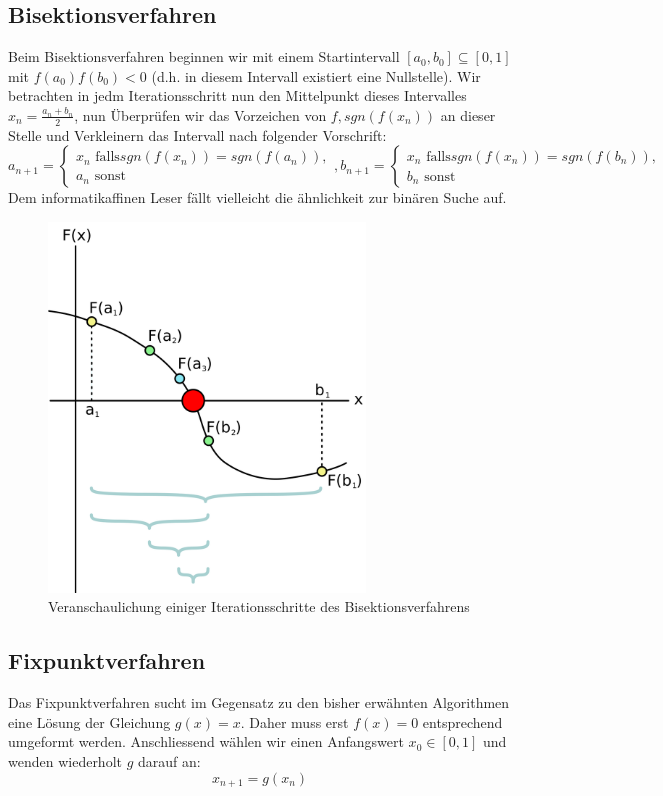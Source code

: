 \documentclass[a4paper,12pt]{article}
\newcommand{\1}{1\hspace{-0,9ex}1}
\begin{document}
\subsection*{Bisektionsverfahren}
Beim Bisektionsverfahren beginnen wir mit einem Startintervall $[a_0, b_0] \subseteq [0,1]$ mit $f(a_0)f(b_0) < 0$ (d.h. in diesem Intervall existiert eine Nullstelle). Wir betrachten in jedm Iterationsschritt nun den Mittelpunkt dieses Intervalles $x_n = \frac{a_n + b_n}{2}$, nun Überprüfen wir das Vorzeichen von $f, sgn(f(x_n))$ an dieser Stelle und Verkleinern das Intervall nach folgender Vorschrift:
\[
	a_{n+1} = \begin{cases}
		x_n\text{ falls} sgn(f(x_n))=sgn(f(a_n)), \\
		a_n\text{ sonst}
	\end{cases}, b_{n+1} = \begin{cases}
		x_n\text{ falls} sgn(f(x_n))=sgn(f(b_n)), \\
		b_n\text{ sonst}
	\end{cases}
\]
Dem informatikaffinen Leser fällt vielleicht die ähnlichkeit zur binären Suche auf.
\begin{figure}[!h]
	\centering
	\includegraphics[width=0.75\textwidth]{plots/Bisection_method.png}
	\caption{Veranschaulichung einiger Iterationsschritte des Bisektionsverfahrens}
\end{figure}
\subsection*{Fixpunktverfahren}
Das Fixpunktverfahren sucht im Gegensatz zu den bisher erwähnten Algorithmen eine Lösung der Gleichung $g(x)=x$. Daher muss erst $f(x)=0$ entsprechend umgeformt werden. Anschliessend wählen wir einen Anfangswert $x_0\in[0,1]$ und wenden wiederholt $g$ darauf an:
\[
	x_{n+1}=g(x_n)
\]
\end{document}

